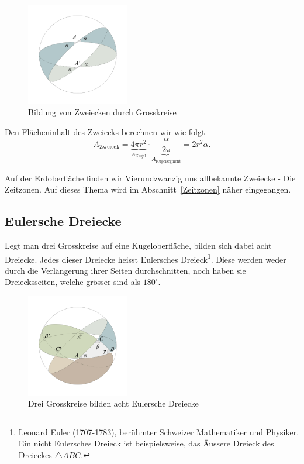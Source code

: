 \begin{refsection}
\begin{figure}[htbp]
\centering
\includegraphics[width=0.4\textwidth]{kugel/Zweieck.jpg}
\caption{Bildung von Zweiecken durch Grosskreise}
\end{figure}

Den Flächeninhalt des Zweiecks berechnen wir wie folgt
\begin{equation}
A_\text{Zweieck}
=
\underbrace{4 \pi r^{2}}_{\displaystyle\text{$A_\text{Kugel}$}} \cdot \underbrace{\frac{ \alpha }{ 2 \pi }}_{\displaystyle\text{$A_\text{Kugelsegment}$}}
=
2 r^{2} \alpha .
\label {V5}
\end{equation}

Auf der Erdoberfläche finden wir Vierundzwanzig uns allbekannte
Zweiecke - Die Zeitzonen. Auf dieses Thema wird im
Abschnitt~\ref{Zeitzonen}  näher eingegangen.


\subsection{Eulersche Dreiecke} \label{Euler} 
%
%
Legt man drei Grosskreise auf eine Kugeloberfläche, bilden sich
dabei acht Dreiecke.
Jedes dieser Dreiecke heisst Eulersches Dreieck\footnote{%
Leonard Euler (1707-1783), berühmter Schweizer Mathematiker und Physiker. 
Ein nicht Eulersches Dreieck ist beispielsweise, das Äussere Dreieck
des Dreieckes
$\triangle{ABC}$.}.
Diese werden weder durch die Verlängerung ihrer Seiten durchschnitten, 
noch haben sie Dreiecksseiten, welche grösser sind als $180^{\circ}$.

\begin{figure}[htbp]
\centering
\includegraphics[width=0.4\textwidth]{kugel/EulerschesDreieck.jpg}
\caption{Drei Grosskreise bilden acht Eulersche Dreiecke}
\label{V10}
\end{figure}



\end{refsection}
